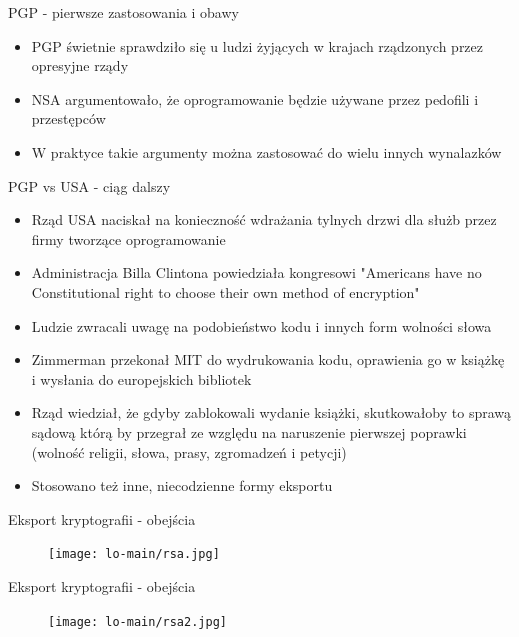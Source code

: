 \documentclass[aspectratio=169]{beamer}
\begin{document}
\begin{frame}{PGP - pierwsze zastosowania i obawy}
    \begin{itemize}
        \item PGP świetnie sprawdziło się u ludzi żyjących w krajach rządzonych przez opresyjne rządy
        \item NSA argumentowało, że oprogramowanie będzie używane przez pedofili i przestępców
        \item W praktyce takie argumenty można zastosować do wielu innych wynalazków
    \end{itemize}
\end{frame}

\begin{frame}{PGP vs USA - ciąg dalszy}
    \begin{itemize}
        \item Rząd USA naciskał na konieczność wdrażania tylnych drzwi dla służb przez firmy tworzące oprogramowanie
        \item Administracja Billa Clintona powiedziała kongresowi "Americans have no Constitutional right to choose their own method of encryption"
        \item Ludzie zwracali uwagę na podobieństwo kodu i innych form wolności słowa
        \item Zimmerman przekonał MIT do wydrukowania kodu, oprawienia go w książkę i wysłania do europejskich bibliotek
        \item Rząd wiedział, że gdyby zablokowali wydanie książki, skutkowałoby to sprawą sądową którą by przegrał ze względu na naruszenie pierwszej poprawki (wolność religii, słowa, prasy, zgromadzeń i petycji)
        \item Stosowano też inne, niecodzienne formy eksportu
    \end{itemize}
\end{frame}

\begin{frame}{Eksport kryptografii - obejścia}
    \begin{figure}
        \centering
        \texttt{[image: lo-main/rsa.jpg]}
    \end{figure}
\end{frame}

\begin{frame}{Eksport kryptografii - obejścia}
    \begin{figure}
        \centering
        \texttt{[image: lo-main/rsa2.jpg]}
    \end{figure}
\end{frame}
\end{document}
